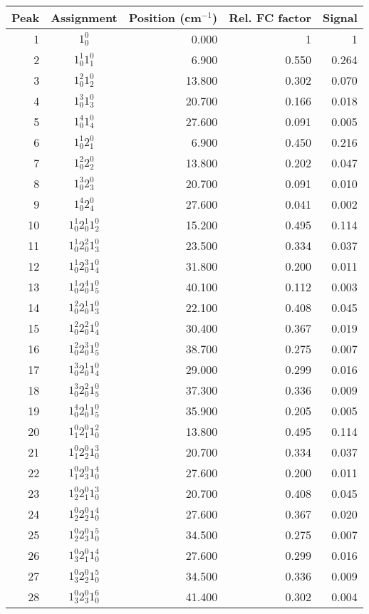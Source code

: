 \documentclass{revtex4}
\begin{document}

\renewcommand{\baselinestretch}{1.5}
\begin{table}
\begin{tabular}{rcrrr}
Peak& Assignment&Position (cm$^{-1}$)& Rel. FC factor& Signal\\
\hline
1& $1^0_0$&0.000&1&1\\
2&$1_0^1 1_1^0$& 6.900& 0.550& 0.264\\
3&$1_0^2 1_2^0$& 13.800& 0.302& 0.070\\
4&$1_0^3 1_3^0$& 20.700& 0.166& 0.018\\
5&$1_0^4 1_4^0$& 27.600& 0.091& 0.005\\
6&$1_0^1 2_1^0$& 6.900& 0.450& 0.216\\
7&$1_0^2 2_2^0$& 13.800& 0.202& 0.047\\
8&$1_0^3 2_3^0$& 20.700& 0.091& 0.010\\
9&$1_0^4 2_4^0$& 27.600& 0.041& 0.002\\
10&$1_0^1 2_0^1 1_2^0$& 15.200& 0.495& 0.114\\
11&$1_0^1 2_0^2 1_3^0$& 23.500& 0.334& 0.037\\
12&$1_0^1 2_0^3 1_4^0$& 31.800& 0.200& 0.011\\
13&$1_0^1 2_0^4 1_5^0$& 40.100& 0.112& 0.003\\
14&$1_0^2 2_0^1 1_3^0$& 22.100& 0.408& 0.045\\
15&$1_0^2 2_0^2 1_4^0$& 30.400& 0.367& 0.019\\
16&$1_0^2 2_0^3 1_5^0$& 38.700& 0.275& 0.007\\
17&$1_0^3 2_0^1 1_4^0$& 29.000& 0.299& 0.016\\
18&$1_0^3 2_0^2 1_5^0$& 37.300& 0.336& 0.009\\
19&$1_0^4 2_0^1 1_5^0$& 35.900& 0.205& 0.005\\
20&$1_1^0 2_1^0 1_0^2$& 13.800& 0.495& 0.114\\
21&$1_1^0 2_2^0 1_0^3$& 20.700& 0.334& 0.037\\
22&$1_1^0 2_3^0 1_0^4$& 27.600& 0.200& 0.011\\
23&$1_2^0 2_1^0 1_0^3$& 20.700& 0.408& 0.045\\
24&$1_2^0 2_2^0 1_0^4$& 27.600& 0.367& 0.020\\
25&$1_2^0 2_3^0 1_0^5$& 34.500& 0.275& 0.007\\
26&$1_3^0 2_1^0 1_0^4$& 27.600& 0.299& 0.016\\
27&$1_3^0 2_2^0 1_0^5$& 34.500& 0.336& 0.009\\
28&$1_3^0 2_3^0 1_0^6$& 41.400& 0.302& 0.004\\

\end{tabular}
\end{table}
\end{document}
